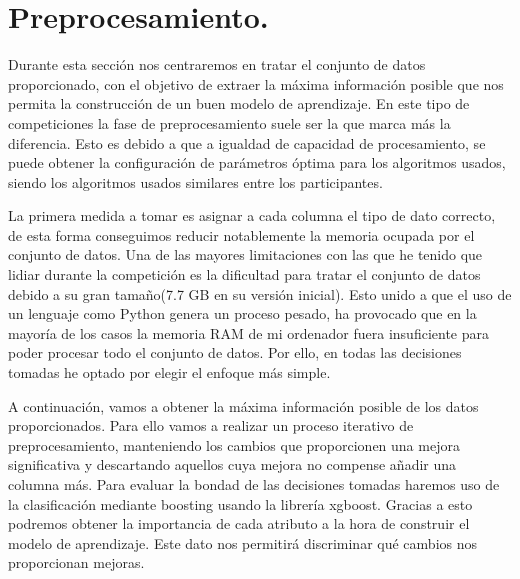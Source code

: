 \chapter{Preprocesamiento.}
Durante esta sección nos centraremos en tratar el conjunto de datos proporcionado, con el objetivo de extraer la máxima información posible que nos permita la construcción de un buen modelo de aprendizaje.
En este tipo de competiciones la fase de preprocesamiento suele ser la que marca más la diferencia. Esto es debido a que a igualdad de capacidad de procesamiento, se puede obtener la configuración de parámetros óptima para los algoritmos usados, siendo los algoritmos usados similares entre los participantes.
\bigskip

La primera medida a tomar es asignar a cada columna el tipo de dato correcto, de esta forma conseguimos reducir notablemente la memoria ocupada por el conjunto de datos. 
Una de las mayores limitaciones con las que he tenido que lidiar durante la competición es la dificultad para tratar el conjunto de datos debido a su gran tamaño(7.7 GB en su versión inicial). Esto unido a que el uso de un lenguaje como Python genera un proceso pesado, ha provocado que en la mayoría de los casos la memoria RAM de mi ordenador fuera insuficiente para poder procesar todo el conjunto de datos. Por ello, en todas las decisiones tomadas he optado por elegir el enfoque más simple.
\medskip

A continuación, vamos a obtener la máxima información posible de los datos proporcionados. Para ello vamos a realizar un proceso iterativo de preprocesamiento, manteniendo los cambios que proporcionen una mejora significativa y descartando aquellos cuya mejora no compense añadir una columna más. Para evaluar la bondad de las decisiones tomadas haremos uso de la clasificación mediante boosting usando la librería xgboost. Gracias a esto podremos obtener la importancia de cada atributo a la hora de construir el modelo de aprendizaje. Este dato nos permitirá discriminar qué cambios nos proporcionan mejoras.
\bigskip

